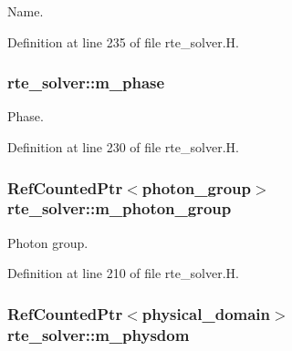 Name. 



Definition at line 235 of file rte\+\_\+solver.\+H.

\subsubsection[{\texorpdfstring{m\+\_\+phase}{m_phase}}]{ rte\+\_\+solver\+::m\+\_\+phase\hspace{0.3cm}{\ttfamily [protected]}}\hypertarget{classrte__solver_aeb46ac9c37dbbb8eb87e603136f841ec}{}\label{classrte__solver_aeb46ac9c37dbbb8eb87e603136f841ec}


Phase. 



Definition at line 230 of file rte\+\_\+solver.\+H.

\subsubsection[{\texorpdfstring{m\+\_\+photon\+\_\+group}{m_photon_group}}]{\setlength{\rightskip}{0pt plus 5cm}Ref\+Counted\+Ptr$<${\bf photon\+\_\+group}$>$ rte\+\_\+solver\+::m\+\_\+photon\+\_\+group\hspace{0.3cm}{\ttfamily [protected]}}\hypertarget{classrte__solver_a9d63be064a2ade825fa898d6d86f1e22}{}\label{classrte__solver_a9d63be064a2ade825fa898d6d86f1e22}


Photon group. 



Definition at line 210 of file rte\+\_\+solver.\+H.

\subsubsection[{\texorpdfstring{m\+\_\+physdom}{m_physdom}}]{\setlength{\rightskip}{0pt plus 5cm}Ref\+Counted\+Ptr$<${\bf physical\+\_\+domain}$>$ rte\+\_\+solver\+::m\+\_\+physdom\hspace{0.3cm}{\ttfamily [protected]}}\hypertarget{classrte__solver_aeef61202054631e0f0ad0fe33a081dfe}{}\label{classrte__solver_aeef61202054631e0f0ad0fe33a081dfe}


